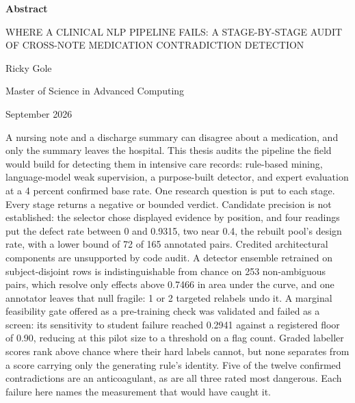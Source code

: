 \begin{frontmatterpage}
  \singlespacing
  {\centering\normalsize\bfseries Abstract\par}

  \begingroup\centering\setlength{\parindent}{0pt}
  {\MakeUppercase{Where a Clinical NLP Pipeline Fails: A Stage-by-Stage Audit of Cross-Note Medication Contradiction Detection}\par}
  \vspace{0.5\baselineskip}
  Ricky Gole\par
  Master of Science in Advanced Computing\par
  September 2026\par
  \endgroup

  \vspace{2\baselineskip}

  {\doublespacing\RaggedRight\parindent=0pt\RaggedRightParindent=0pt
  A nursing note and a discharge summary can disagree about a medication, and only the summary leaves
the hospital. This thesis audits the pipeline the field would build for detecting them in intensive
care records: rule-based mining, language-model weak supervision, a purpose-built detector, and
expert evaluation at a 4 percent confirmed base rate. One research question is put to each stage.
Every stage returns a negative or bounded
verdict. Candidate precision is not established: the selector chose displayed evidence by
position, and four readings put the defect rate between 0 and 0.9315, two near 0.4, the rebuilt pool's
design rate, with a lower bound of 72 of 165 annotated pairs. Credited architectural components are unsupported by
code audit. A detector ensemble retrained on subject-disjoint rows is indistinguishable from chance
on 253 non-ambiguous pairs, which resolve only effects above 0.7466 in area under the curve, and one
annotator leaves that null fragile: 1 or 2 targeted relabels undo it. A marginal feasibility gate
offered as a pre-training check was validated and failed as a screen: its sensitivity to student
failure reached 0.2941 against a registered floor of 0.90, reducing at this pilot size to a
threshold on a flag count. Graded labeller scores rank above chance where their hard labels cannot,
but none separates from a score carrying only the generating rule's identity. Five of the twelve
confirmed contradictions are an anticoagulant, as are all three rated most dangerous. Each failure
here names the measurement that would have caught it.
\par}
\end{frontmatterpage}
